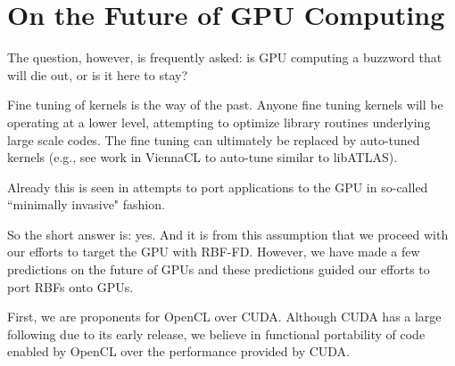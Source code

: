 \documentclass{report}
\begin{document}
%
%


\section{On the Future of GPU Computing}

The question, however, is frequently asked: is GPU computing a buzzword that will die out, or is it here to stay? 

Fine tuning of kernels is the way of the past. Anyone fine tuning kernels will be operating at a lower level, attempting to optimize library routines underlying large scale codes. The fine tuning can ultimately be replaced by auto-tuned kernels (e.g., see work in ViennaCL to auto-tune similar to libATLAS). 

Already this is seen in attempts to port applications to the GPU in so-called ``minimally invasive" fashion. 

So the short answer is: yes. And it is from this assumption that we proceed with our efforts to target the GPU with RBF-FD. However, we have made a few predictions on the future of GPUs and these predictions guided our efforts to port RBFs onto GPUs. 

First, we are proponents for OpenCL over CUDA. Although CUDA has a large following due to its early release, we believe in functional portability of code enabled by OpenCL over the performance provided by CUDA. 
\end{document}
